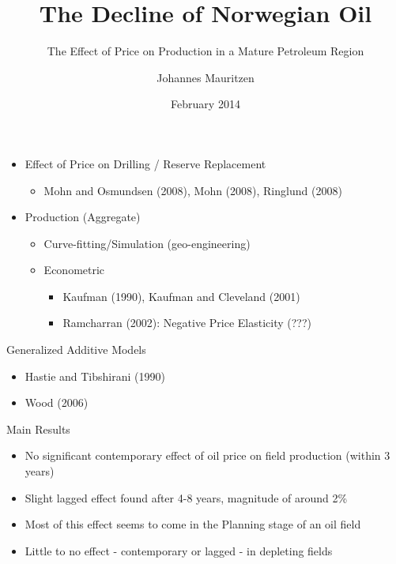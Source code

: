 \documentclass{beamer}
\title[OIL]{The Decline of Norwegian Oil}
\subtitle[Errors]{The Effect of Price on Production in a Mature Petroleum Region}
\author[J. Mauritzen]{Johannes Mauritzen}
\institute[NHH]{
  \texttt{johannes.mauritzen@nhh.edu}
}
\date[Feb 2014]{February 2014}
\begin{document}
\begin{frame}[plain]
  \titlepage
\end{frame}




\begin{frame}[plain]
	\begin{itemize}

	\item Effect of Price on Drilling / Reserve Replacement
	\begin{itemize} \item Mohn and Osmundsen (2008), Mohn (2008), Ringlund (2008) \end{itemize}
	 \item Production (Aggregate)

		\begin{itemize}
		\item Curve-fitting/Simulation (geo-engineering)
		\item Econometric
			\begin{itemize}
			\item Kaufman (1990), Kaufman and Cleveland (2001)
			\item Ramcharran (2002):  Negative Price Elasticity (???)
	 		\end{itemize}
	 	\end{itemize}
	\end{itemize}
\end{frame}

\begin{frame}[plain]
Generalized Additive Models
\begin{itemize}
\item  Hastie and Tibshirani (1990) 
\item  Wood (2006)
\end {itemize}

\end{frame}

\begin{frame}[plain]
Main Results
\begin{itemize}
\item  No significant contemporary effect of oil price on field production (within 3 years)
\item Slight lagged effect found after 4-8 years, magnitude of around 2\%
\item Most of this effect seems to come in the Planning stage of an oil field
\item Little to no effect - contemporary or lagged - in depleting fields
\end {itemize}

\end{frame}
\end{document}
